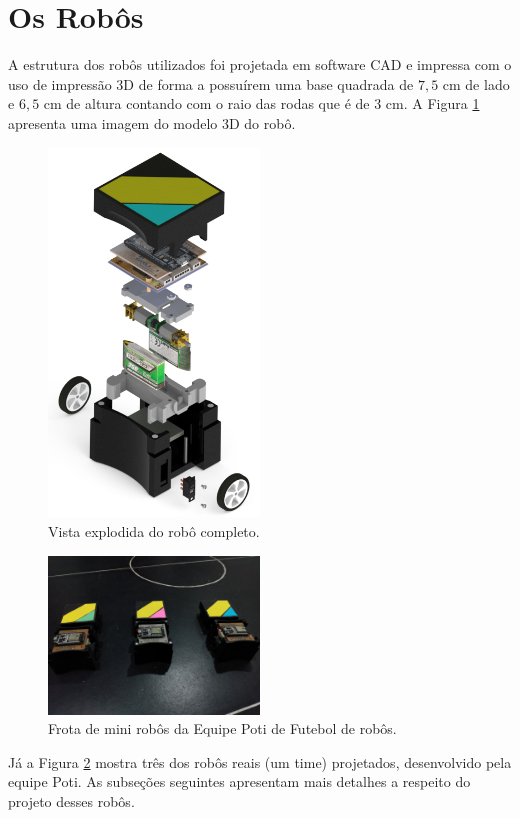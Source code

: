 \section{Os Robôs}
A estrutura dos robôs utilizados foi projetada em software CAD e impressa com o uso de impressão 3D de forma a possuírem uma base quadrada de $7,5$ cm de lado e $6,5$ cm de altura contando com o raio das rodas que é de $3$ cm. A Figura \ref{fig:robo_completo_explodido} apresenta uma imagem do modelo 3D do robô.\\

\begin{figure}[H]
    \centering
    \includegraphics[width=0.5\textwidth]{figuras/robo/robo_completo_explodido.png}
    \caption{Vista explodida do robô completo.}
    \label{fig:robo_completo_explodido}
\end{figure}

\begin{figure}[H]
    \centering
    \includegraphics[width=0.5\textwidth]{figuras/robo/robos_capa_aberta.jpg}
    \caption{Frota de mini robôs da Equipe Poti de Futebol de robôs.}
    \label{fig:robos_capa_aberta}
\end{figure}

Já a Figura \ref{fig:robos_capa_aberta} mostra três dos robôs reais (um time) projetados, desenvolvido pela equipe Poti. As subseções seguintes apresentam mais detalhes a respeito do projeto desses robôs.


